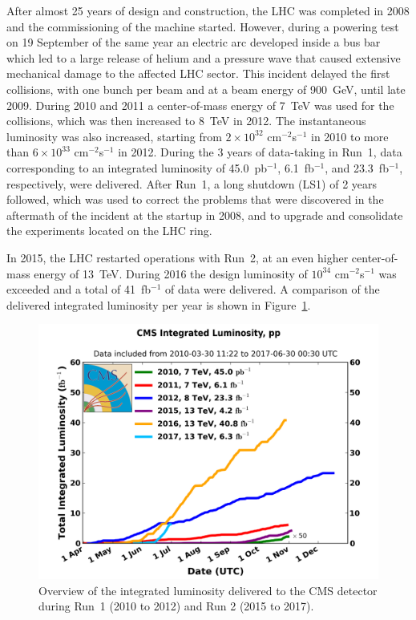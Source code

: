After almost 25 years of design and construction, the \ac{LHC} was completed in 2008 and the commissioning of the machine started. However, during a powering test on 19 September of the same year an electric arc developed inside a bus bar which led to a large release of helium and a pressure wave that caused extensive mechanical damage to the affected LHC sector. This incident delayed the first collisions, with one bunch per beam and at a beam energy of \SI{900}{GeV}, until late 2009. During 2010 and 2011 a center-of-mass energy of \SI{7}{TeV} was used for the collisions, which was then increased to \SI{8}{TeV} in 2012. The instantaneous luminosity was also increased, starting from $2 \times 10^{32}$ cm$^{-2}$s$^{-1}$ in 2010 to more than $6 \times 10^{33}$ cm$^{-2}$s$^{-1}$ in 2012. During the 3 years of data-taking in Run~1, data corresponding to an integrated luminosity of 45.0~pb$^{-1}$, 6.1~fb$^{-1}$, and 23.3~fb$^{-1}$, respectively, were delivered. After Run~1, a long shutdown (LS1) of 2 years followed, which was used to correct the problems that were discovered in the aftermath of the incident at the startup in 2008, and to upgrade and consolidate the experiments located on the \ac{LHC} ring.

In 2015, the \ac{LHC} restarted operations with Run~2, at an even higher center-of-mass energy of \SI{13}{TeV}. During 2016 the design luminosity of $10^{34}$ cm$^{-2}$s$^{-1}$ was exceeded and a total of 41~fb$^{-1}$ of data were delivered. A comparison of the delivered integrated luminosity per year is shown in Figure~\ref{fig:lumi}.

\begin{figure}[ht]
  \centering
 \includegraphics[width=.75\textwidth]{CMS_lumi_allyears}
 \caption{Overview of the integrated luminosity delivered to the CMS detector during Run~1 (2010 to 2012) and Run 2 (2015 to 2017).}
 \label{fig:lumi}
\end{figure}

